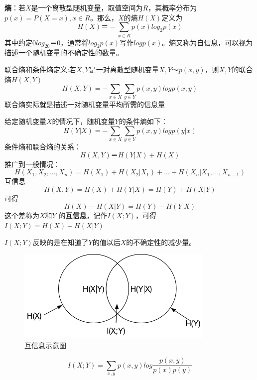 \documentclass[12pt,a4paper]{article}
\begin{document}
\textbf{熵}：若$X$是一个离散型随机变量，取值空间为$R$，其概率分布为$p(x)=P(X=x),x\in R$。那么，$X$的熵$H(X)$定义为
\begin{equation}
H(X) ＝ -\sum_{x\in R}p(x)log_2p(x)
\end{equation}
其中约定$0log_20 ＝ 0$，通常将$log_2p(x)$写作$logp(x)$。熵又称为自信息，可以视为描述一个随机变量的不确定性的数量。

联合熵和条件熵定义:若$X,Y$是一对离散型随机变量$X,Y ～ p(x,y)$，则$X,Y$的联合熵$H(X,Y)$
\begin{equation}
H(X,Y) = -\sum_{x\in X}\sum_{y\in Y}p(x,y)logp(x,y)
\end{equation}
联合熵实际就是描述一对随机变量平均所需的信息量

给定随机变量$X$的情况下，随机变量$Y$的条件熵如下：
\begin{equation}
H(Y|X) = -\sum_{x\in X}\sum_{y\in Y}p(x,y)logp(y|x)
\end{equation}
条件熵和联合熵的关系：
\begin{equation}
H(X,Y)  ＝ H(Y|X) + H(X)
\end{equation}
推广到一般情况：
\begin{equation}
H(X_1,X_2,...,X_n) = H(X_1)+H(X_2|X_1)+...+H(X_n|X_1,...,X_{n-1})
\end{equation}
互信息
\begin{equation}
H(X,Y) = H(X) + H(Y|X) = H(Y) + H(X|Y)
\end{equation}
可得
\begin{equation}
H(X)-H(X|Y) = H(Y)-H(Y|X)
\end{equation}
这个差称为$X$和$Y$ 的\textbf{互信息}，记作$I(X;Y)$，可得$I(X;Y)=H(X)-H(X|Y)$

$I(X;Y)$反映的是在知道了$Y$的值以后$X$的不确定性的减少量。
\begin{figure}
  \centering
  \includegraphics[width=0.7\linewidth]{./figures/mutualInfo.png}
  \caption{互信息示意图}\label{fig:muinfo}
\end{figure}

\begin{equation}
I(X;Y) = \sum_{x,y} p(x,y) log \frac{p(x,y)}{p(x)p(y)}
\end{equation}
\end{document}
